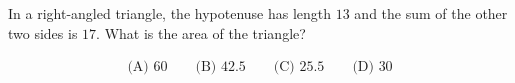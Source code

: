 In a right-angled triangle, the hypotenuse has length $13$ and the sum of the other two sides is $17$. What is the area of the triangle?



\begin{align*} \text{(A) }60 \qquad
\text{(B) }42.5 \qquad
\text{(C) }25.5 \qquad
\text{(D) }30 \end{align*}
